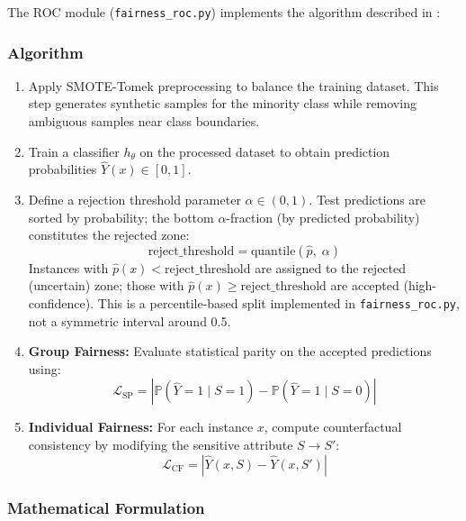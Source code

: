 \documentclass[12pt,a4paper]{article}
\begin{document}
The ROC module (\texttt{fairness\_roc.py}) implements the algorithm described in \cite{nagpal2024multiobj}:
\subsubsection{Algorithm}

\begin{enumerate}
    \item Apply SMOTE-Tomek preprocessing to balance the training dataset. This step generates synthetic samples for the minority class while removing ambiguous samples near class boundaries.
    
    \item Train a classifier $h_{\theta}$ on the processed dataset to obtain prediction probabilities $\hat{Y}(x) \in [0,1]$.
    
    \item Define a rejection threshold parameter $\alpha \in (0,1)$. Test predictions are sorted by probability; the bottom $\alpha$-fraction (by predicted probability) constitutes the rejected zone:
    \begin{equation}
        \text{reject\_threshold} = \text{quantile}(\hat{p},\; \alpha)
    \end{equation}
    Instances with $\hat{p}(x) < \text{reject\_threshold}$ are assigned to the rejected (uncertain) zone; those with $\hat{p}(x) \geq \text{reject\_threshold}$ are accepted (high-confidence). This is a percentile-based split implemented in \texttt{fairness\_roc.py}, not a symmetric interval around 0.5.
    
    \item \textbf{Group Fairness:} Evaluate statistical parity on the accepted predictions using:
    \begin{equation}
        \mathcal{L}_{\text{SP}} = \left| \mathbb{P}(\hat{Y}=1 \mid S=1) - \mathbb{P}(\hat{Y}=1 \mid S=0) \right|
    \end{equation}
    
    \item \textbf{Individual Fairness:} For each instance $x$, compute counterfactual consistency by modifying the sensitive attribute $S \rightarrow S'$:
    \begin{equation}
        \mathcal{L}_{\text{CF}} = \left| \hat{Y}(x, S) - \hat{Y}(x, S') \right|
    \end{equation}
\end{enumerate}

\subsubsection{Mathematical Formulation}
\end{document}
